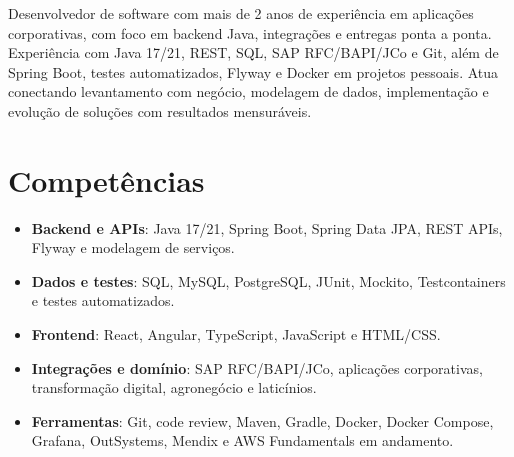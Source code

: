 \documentclass[11pt,a4paper,sans]{moderncv}
\begin{document}
\makecvtitle


\vspace{6pt}
\small{Desenvolvedor de software com mais de 2 anos de experiência em aplicações corporativas, com foco em backend Java, integrações e entregas ponta a ponta. Experiência com Java 17/21, REST, SQL, SAP RFC/BAPI/JCo e Git, além de Spring Boot, testes automatizados, Flyway e Docker em projetos pessoais. Atua conectando levantamento com negócio, modelagem de dados, implementação e evolução de soluções com resultados mensuráveis.}


\section{Competências}
\vspace{1pt}
\begin{itemize}

\item \textbf{Backend e APIs}: Java 17/21, Spring Boot, Spring Data JPA, REST APIs, Flyway e modelagem de serviços.

\item \textbf{Dados e testes}: SQL, MySQL, PostgreSQL, JUnit, Mockito, Testcontainers e testes automatizados.

\item \textbf{Frontend}: React, Angular, TypeScript, JavaScript e HTML/CSS.

\item \textbf{Integrações e domínio}: SAP RFC/BAPI/JCo, aplicações corporativas, transformação digital, agronegócio e laticínios.

\item \textbf{Ferramentas}: Git, code review, Maven, Gradle, Docker, Docker Compose, Grafana, OutSystems, Mendix e AWS Fundamentals em andamento.

\end{itemize}

\end{document}
